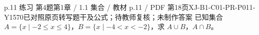 \par\noindent\begin{minipage}{\linewidth}
\begin{bankitem}{p.11 练习 第4题}{第1章 / 1.1 集合 / 教材 p.11 / PDF 第18页}{XJ-B1-C01-PR-P011-Y1570}{已对照原页转写题干及公式；待教师复核；未制作答案}
已知集合 $A=\{x\mid-2\le x\le4\}$，$B=\{x\mid-4<x<-2\}$，求 $A\cup B$，$A\cap B$。
\end{bankitem}
\end{minipage}\par\medskip
